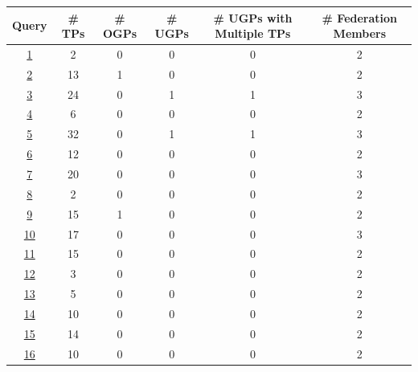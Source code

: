 \begin{longtable}{|c|c|c|c|c|c|}
    \hline
    Query & \# TPs & \# OGPs & \# UGPs & \# UGPs with Multiple TPs & \# Federation Members \\
    \hline
    \href{https://sparql.uniprot.org/.well-known/sparql-examples/92_uniprot_bioregistry_iri_translation}{1} & 2 & 0 & 0 & 0 & 2 \\
    \hline
    \href{https://sparql.uniprot.org/.well-known/sparql-examples/51}{2} & 13 & 1 & 0 & 0 & 2 \\
    \hline
    \href{https://sparql.uniprot.org/.well-known/sparql-examples/45}{3} & 24 & 0 & 1 & 1 & 3 \\
    \hline
    \href{https://sparql.uniprot.org/.well-known/sparql-examples/46}{4} & 6 & 0 & 0 & 0 & 2 \\
    \hline
    \href{https://sparql.uniprot.org/.well-known/sparql-examples/52}{5} & 32 & 0 & 1 & 1 & 3 \\
    \hline
    \href{https://sparql.uniprot.org/.well-known/sparql-examples/40}{6} & 12 & 0 & 0 & 0 & 2 \\
    \hline
    \href{https://sparql.uniprot.org/.well-known/sparql-examples/53}{7} & 20 & 0 & 0 & 0 & 3 \\
    \hline
    \href{https://sparql.uniprot.org/.well-known/sparql-examples/99_uniprot_identifiers_org_translation}{8} & 2 & 0 & 0 & 0 & 2 \\
    \hline
    \href{https://sparql.uniprot.org/.well-known/sparql-examples/36}{9} & 15 & 1 & 0 & 0 & 2 \\
    \hline
    \href{https://sparql.uniprot.org/.well-known/sparql-examples/50}{10} & 17 & 0 & 0 & 0 & 3 \\
    \hline
    \href{https://sparql.uniprot.org/.well-known/sparql-examples/54}{11} & 15 & 0 & 0 & 0 & 2 \\
    \hline
    \href{https://sparql.uniprot.org/.well-known/sparql-examples/42}{12} & 3 & 0 & 0 & 0 & 2 \\
    \hline
    \href{https://sparql.uniprot.org/.well-known/sparql-examples/43}{13} & 5 & 0 & 0 & 0 & 2 \\
    \hline
    \href{https://sparql.uniprot.org/.well-known/sparql-examples/70_enzymes_interacting_with_molecules_similar_to_dopamine}{14} & 10 & 0 & 0 & 0 & 2 \\
    \hline
    \href{https://sparql.uniprot.org/.well-known/sparql-examples/38}{15} & 14 & 0 & 0 & 0 & 2 \\
    \hline
    \href{https://sparql.uniprot.org/.well-known/sparql-examples/48}{16} & 10 & 0 & 0 & 0 & 2 \\

\end{longtable}
